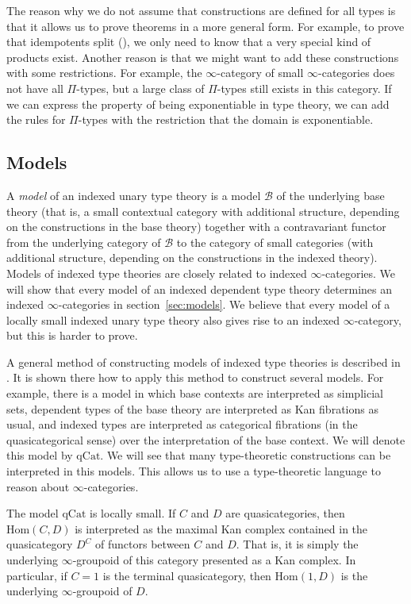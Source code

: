 \documentclass[reqno]{mscs}
\newcommand{\fs}[1]{\mathrm{#1}}
\newcommand{\cat}[1]{\mathcal{#1}}
\newcommand{\Hom}{\fs{Hom}}
\newcommand{\qCat}{\fs{qCat}}
\numberwithin{figure}{section}
\begin{document}
The reason why we do not assume that constructions are defined for all types is that it allows us to prove theorems in a more general form.
For example, to prove that idempotents split (), we only need to know that a very special kind of products exist.
Another reason is that we might want to add these constructions with some restrictions.
For example, the $\infty$-category of small $\infty$-categories does not have all $\Pi$-types, but a large class of $\Pi$-types still exists in this category.
If we can express the property of being exponentiable in type theory, we can add the rules for $\Pi$-types with the restriction that the domain is exponentiable.

\subsection{Models}
\label{sec:unary-models}

A \emph{model} of an indexed unary type theory is a model $\cat{B}$ of the underlying base theory (that is, a small contextual category with additional structure, depending on the constructions in the base theory)
together with a contravariant functor from the underlying category of $\cat{B}$ to the category of small categories (with additional structure, depending on the constructions in the indexed theory).
Models of indexed type theories are closely related to indexed $\infty$-categories.
We will show that every model of an indexed dependent type theory determines an indexed $\infty$-categories in section~\ref{sec:models}.
We believe that every model of a locally small indexed unary type theory also gives rise to an indexed $\infty$-category, but this is harder to prove.

A general method of constructing models of indexed type theories is described in \cite{indexed-models}.
It is shown there how to apply this method to construct several models.
For example, there is a model in which base contexts are interpreted as simplicial sets, dependent types of the base theory are interpreted as Kan fibrations as usual,
and indexed types are interpreted as categorical fibrations (in the quasicategorical sense) over the interpretation of the base context.
We will denote this model by $\qCat$.
We will see that many type-theoretic constructions can be interpreted in this models.
This allows us to use a type-theoretic language to reason about $\infty$-categories.

The model $\qCat$ is locally small.
If $C$ and $D$ are quasicategories, then $\Hom(C,D)$ is interpreted as the maximal Kan complex contained in the quasicategory $D^C$ of functors between $C$ and $D$.
That is, it is simply the underlying $\infty$-groupoid of this category presented as a Kan complex.
In particular, if $C = 1$ is the terminal quasicategory, then $\Hom(1,D)$ is the underlying $\infty$-groupoid of $D$.
\end{document}
